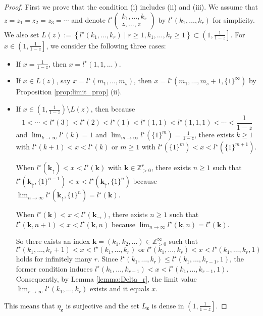 \documentclass[12pt,a4paper]{article}
\theoremstyle{remark}
\begin{document}
\begin{proof}
First we prove that 
the condition (i) 
includes (ii) and (iii).
We assume that 
$z=z_1=z_2=z_3=\cdots $ and 
denote 
$l^{\star}\begin{pmatrix}
k_1,\ldots, k_r\\
z, \ldots , z
\end{pmatrix}$ by
$l^{\star}(k_1,\ldots, k_r)$
for simplicity.
We also set 
$L(z):= \left\{  l^{\star}(k_1,\ldots, k_r) \mid r\ge 1, k_1,\ldots, k_r \ge 1  \right\} \subset \left( 1, \frac{1}{1-z} \right]$.
For $x\in  \left( 1, \frac{1}{1-z} \right]$, we consider the 
following three cases:
\begin{itemize}

\item 
If $x=\frac{1}{1-z}$, then 
$x=l^{\star} (1,1,\ldots)$.
\item 
If $x\in L(z)$, say $x=
l^{\star}(m_1,\ldots, m_s)$, then
$x= 
l^{\star}(m_1,\ldots, m_s+1, \{1\}^{\infty})$ by
Proposition \ref{prop:limit_prop} (ii).

\item If $x\in \left( 1, \frac{1}{1-z} \right)
\setminus L(z)$, then
because 
\[ 1< \cdots < l^{\star}(3)< l^{\star}(2)< l^{\star}(1)<
l^{\star}(1,1)<l^{\star}(1,1,1)<\cdots <\frac{1}{1-z} \]
and $\lim_{k\to \infty}l^{\star}(k) =1$ and 
$\lim_{m\to \infty}l^{\star}(\{1\}^m) = \frac{1}{1-z}$,
there exists $k\ge 1$ with $l^{\star}(k+1)<x<l^{\star}(k) $
or $m\ge 1$ with $l^{\star}(\{1\}^m)<x<l^{\star}(\{1\}^{m+1})$.  



When $l^{\star}(\boldsymbol{k}_{\uparrow})
<x < l^{\star}(\boldsymbol{k})$
with $\boldsymbol{k}\in \mathbb{Z}_{>0}^r$,
there exists $n\ge 1$ such that 
$l^{\star}(\boldsymbol{k}_{\uparrow},\{1\}^{n-1})<x<
l^{\star}(\boldsymbol{k}_{\uparrow},\{1\}^{n})$
because 
$\lim_{n\to\infty}l^{\star}(\boldsymbol{k}_{\uparrow}, \{1\}^n)=
l^{\star}(\boldsymbol{k})$.

When $l^{\star}(\boldsymbol{k})
<x < l^{\star}(\boldsymbol{k}_{\rightarrow})$,
there exists $n\ge 1$ such that 
$l^{\star}(\boldsymbol{k},n+1)
<x< l^{\star}(\boldsymbol{k},n)$
because 
$\lim_{n\to\infty}l^{\star}(\boldsymbol{k}, n)=
l^{\star}(\boldsymbol{k})$.

So there exists an index
$\boldsymbol{k}=(k_1,k_2, \ldots ) \in\mathbb{Z}_{>0}^{\infty}$
such that 
\[ l^{\star}(k_1,\ldots, k_r+1) <x< l^{\star}(k_1,\ldots, k_r)
\text{ or }
l^{\star}(k_1,\ldots, k_r) <x< l^{\star}(k_1,\ldots, k_r,1)\]
holds for infinitely many $r$.
Since $l^{\star}(k_1,\ldots, k_r)
\le l^{\star}(k_1,\ldots, k_{r-1},1)$,
the former condition induces 
$l^{\star}(k_1,\ldots, k_{r-1})
<x< l^{\star}(k_1,\ldots, k_{r-1},1)$.
Consequently, by Lemma \ref{lemma:Delta_r},
the limit value 
$\lim_{r\to \infty} l^{\star}(k_1,\ldots, k_r)$ exists and 
it equals $x$.
\end{itemize}
This means that $\eta_{\boldsymbol{z}}$ is surjective
and the set $L_{\boldsymbol{z}}$ is dense in 
$\left(1, \tfrac{1}{1-z} \right]$.


\end{proof}
\end{document}
